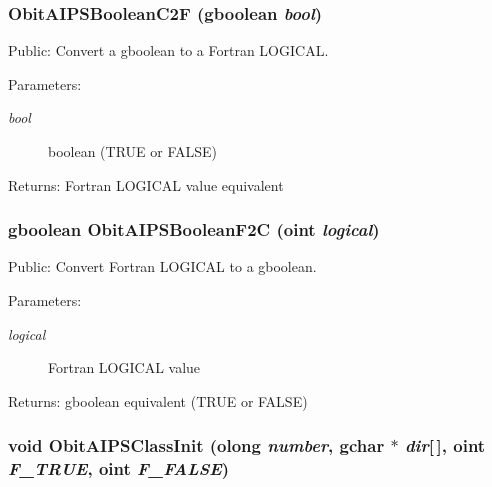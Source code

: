\subsubsection{ Obit\-AIPSBoolean\-C2F (gboolean {\em bool})}\label{ObitAIPS_8c_a20}


Public: Convert a gboolean to a Fortran LOGICAL. 

\begin{Desc}
\item[Parameters:]
\begin{description}
\item[{\em bool}]boolean (TRUE or FALSE) \end{description}
\end{Desc}
\begin{Desc}
\item[Returns:]Fortran LOGICAL value equivalent \end{Desc}
\subsubsection{\setlength{\rightskip}{0pt plus 5cm}gboolean Obit\-AIPSBoolean\-F2C ({\bf oint} {\em logical})}\label{ObitAIPS_8c_a19}


Public: Convert Fortran LOGICAL to a gboolean. 

\begin{Desc}
\item[Parameters:]
\begin{description}
\item[{\em logical}]Fortran LOGICAL value \end{description}
\end{Desc}
\begin{Desc}
\item[Returns:]gboolean equivalent (TRUE or FALSE) \end{Desc}
\subsubsection{\setlength{\rightskip}{0pt plus 5cm}void Obit\-AIPSClass\-Init ({\bf olong} {\em number}, gchar $\ast$ {\em dir}[$\,$], {\bf oint} {\em F\_\-TRUE}, {\bf oint} {\em F\_\-FALSE})}\label{ObitAIPS_8c_a5}


